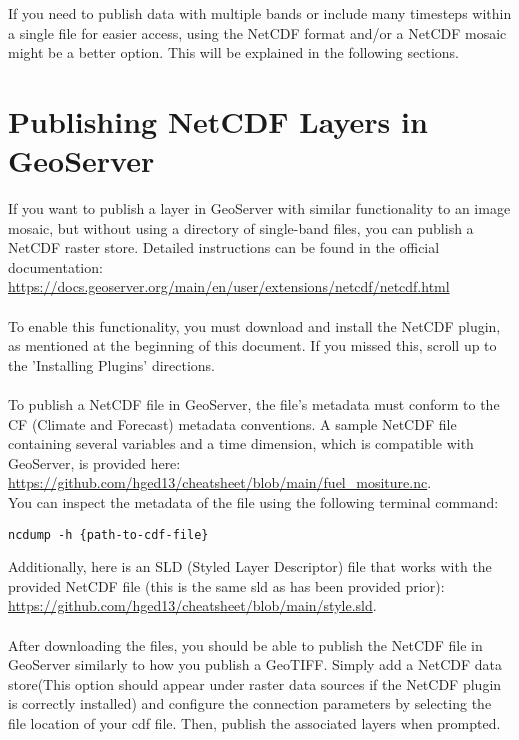 \documentclass{article}
\begin{document}
If you need to publish data with multiple bands or include many timesteps within a single file for easier access, using the NetCDF format and/or a NetCDF mosaic might be a better option. This will be explained in the following sections.


\section{Publishing NetCDF Layers in GeoServer}

If you want to publish a layer in GeoServer with similar functionality to an image mosaic, but without using a directory of single-band files, you can publish a NetCDF raster store. Detailed instructions can be found in the official documentation:  \\
\url{https://docs.geoserver.org/main/en/user/extensions/netcdf/netcdf.html}
 \\ \\
To enable this functionality, you must download and install the NetCDF plugin, as mentioned at the beginning of this document. If you missed this, scroll up to the  'Installing Plugins' directions. 
\\ \\
To publish a NetCDF file in GeoServer, the file’s metadata must conform to the CF (Climate and Forecast) metadata conventions. A sample NetCDF file containing several variables and a time dimension, which is compatible with GeoServer, is provided here: \url{https://github.com/hged13/cheatsheet/blob/main/fuel_mositure.nc}. \\

You can inspect the metadata of the file using the following terminal command:

\begin{verbatim}
ncdump -h {path-to-cdf-file}
\end{verbatim}

Additionally, here is an SLD (Styled Layer Descriptor) file that works with the provided NetCDF file (this is the same sld as has been provided prior): \url{https://github.com/hged13/cheatsheet/blob/main/style.sld}.
 \\ \\
After downloading the files, you should be able to publish the NetCDF file in GeoServer similarly to how you publish a GeoTIFF. Simply add a NetCDF data store(This option should appear under raster data sources if the NetCDF plugin is correctly installed) and configure the connection parameters by selecting the file location of your cdf file. Then, publish the associated layers when prompted.
\end{document}
